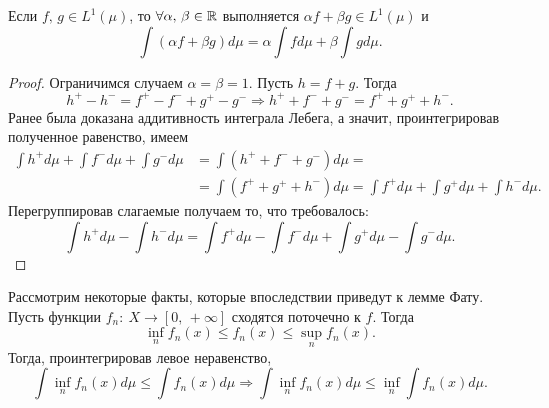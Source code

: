 \begin{claim}
    Если $f,\, g\in L^{1}(\mu)$, то $\forall \alpha,\, \beta\in\mathbb{R}$ выполняется
    $\alpha f+\beta g\in L^1(\mu)$ и \[
        \int (\alpha f+\beta g)d\mu=\alpha\int fd\mu + \beta\int gd\mu.
    \]

    \begin{proof}

        Ограничимся случаем $\alpha=\beta=1$. Пусть $h=f+g$. Тогда \[
            h^+-h^-=f^+-f^-+g^+-g^-\Rightarrow
            h^++f^-+g^-=f^++g^++h^-.
        \]
        Ранее была доказана аддитивность интеграла Лебега, а значит, проинтегрировав полученное равенство,
        имеем \begin{align*}
            \int h^+d\mu+\int f^-d\mu+\int g^-d\mu & =
            \int \left(h^++f^-+g^-\right)d\mu=                                           \\
                                                   & =\int \left(f^++g^++h^-\right)d\mu=
            \int f^+d\mu+\int g^+d\mu+\int h^-d\mu.
        \end{align*}
        Перегруппировав слагаемые получаем то, что требовалось: \[
            \int h^+d\mu-\int h^-d\mu=
            \int f^+d\mu-\int f^-d\mu+\int g^+d\mu-\int g^-d\mu.
        \]

    \end{proof}
\end{claim}

Рассмотрим некоторые факты, которые впоследствии приведут к лемме Фату.
Пусть функции $f_n:\: X\to[0,\, +\infty]$ сходятся поточечно к $f$. Тогда \[
    \inf_{n}f_n(x)\leqslant f_n(x)\leqslant\sup_n f_n(x).
\]
Тогда, проинтегрировав левое неравенство, \begin{equation}
    \label{eq:lect13:ints}
    \int \inf_n f_n(x)d\mu\leqslant\int f_n(x)d\mu\Rightarrow
    \int \inf_n f_n(x)d\mu\leqslant\inf_n\int f_n(x)d\mu.
\end{equation}

